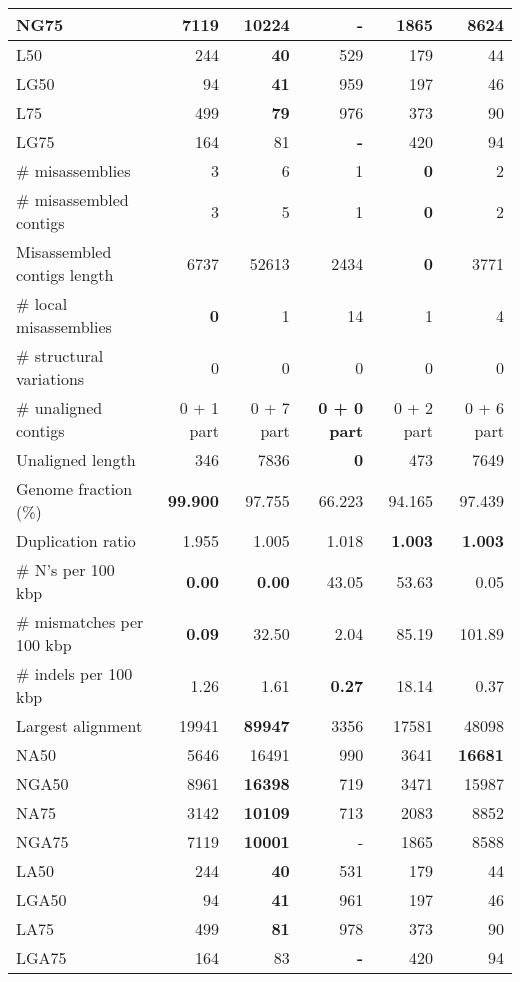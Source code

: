 \documentclass[12pt,a4paper]{article}
\begin{document}
\begin{table}[ht]
\begin{center}
\begin{tabular}{|l*{5}{|r}|}
NG75 & 7119 & {\bf 10224} & - & 1865 & 8624 \\ \hline
L50 & 244 & {\bf 40} & 529 & 179 & 44 \\ \hline
LG50 & 94 & {\bf 41} & 959 & 197 & 46 \\ \hline
L75 & 499 & {\bf 79} & 976 & 373 & 90 \\ \hline
LG75 & 164 & 81 & {\bf -} & 420 & 94 \\ \hline
\# misassemblies & 3 & 6 & 1 & {\bf 0} & 2 \\ \hline
\# misassembled contigs & 3 & 5 & 1 & {\bf 0} & 2 \\ \hline
Misassembled contigs length & 6737 & 52613 & 2434 & {\bf 0} & 3771 \\ \hline
\# local misassemblies & {\bf 0} & 1 & 14 & 1 & 4 \\ \hline
\# structural variations & 0 & 0 & 0 & 0 & 0 \\ \hline
\# unaligned contigs & 0 + 1 part & 0 + 7 part & {\bf 0 + 0 part} & 0 + 2 part & 0 + 6 part \\ \hline
Unaligned length & 346 & 7836 & {\bf 0} & 473 & 7649 \\ \hline
Genome fraction (\%) & {\bf 99.900} & 97.755 & 66.223 & 94.165 & 97.439 \\ \hline
Duplication ratio & 1.955 & 1.005 & 1.018 & {\bf 1.003} & {\bf 1.003} \\ \hline
\# N's per 100 kbp & {\bf 0.00} & {\bf 0.00} & 43.05 & 53.63 & 0.05 \\ \hline
\# mismatches per 100 kbp & {\bf 0.09} & 32.50 & 2.04 & 85.19 & 101.89 \\ \hline
\# indels per 100 kbp & 1.26 & 1.61 & {\bf 0.27} & 18.14 & 0.37 \\ \hline
Largest alignment & 19941 & {\bf 89947} & 3356 & 17581 & 48098 \\ \hline
NA50 & 5646 & 16491 & 990 & 3641 & {\bf 16681} \\ \hline
NGA50 & 8961 & {\bf 16398} & 719 & 3471 & 15987 \\ \hline
NA75 & 3142 & {\bf 10109} & 713 & 2083 & 8852 \\ \hline
NGA75 & 7119 & {\bf 10001} & - & 1865 & 8588 \\ \hline
LA50 & 244 & {\bf 40} & 531 & 179 & 44 \\ \hline
LGA50 & 94 & {\bf 41} & 961 & 197 & 46 \\ \hline
LA75 & 499 & {\bf 81} & 978 & 373 & 90 \\ \hline
LGA75 & 164 & 83 & {\bf -} & 420 & 94 \\ \hline
\end{tabular}
\end{center}
\end{table}
\end{document}

